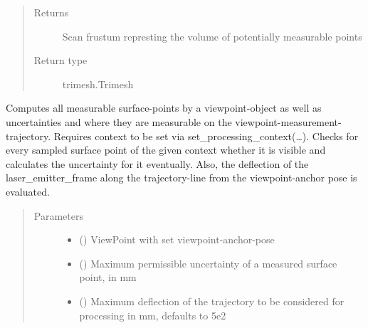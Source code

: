 \documentclass[letterpaper,10pt,english]{sphinxmanual}
\begin{document}
\begin{fulllineitems}
\begin{fulllineitems}
\begin{quote}
\begin{description}
\item[{Returns}] \leavevmode
Scan frustum represting the volume of potentially measurable points

\item[{Return type}] \leavevmode
trimesh.Trimesh

\end{description}\end{quote}

\end{fulllineitems}


\begin{fulllineitems}
\label{\detokenize{module_sensor_model:agiprobot_measurement.sensor_model.SensorModel.process_viewpoint_metrologically}}
Computes all measurable surface-points by a viewpoint-object as well as uncertainties and where they are measurable on the viewpoint-measurement-trajectory.
Requires context to be set via set\_processing\_context(…). Checks for every sampled surface point of the given context whether it is visible and calculates the
uncertainty for it eventually. Also, the deflection of the laser\_emitter\_frame along the trajectory-line from the viewpoint-anchor pose is evaluated.
\begin{quote}\begin{description}
\item[{Parameters}] \leavevmode\begin{itemize}
\item {} 
 ({\hyperref[\detokenize{module_view:agiprobot_measurement.viewpoint.ViewPoint}]{}}) \textendash{} ViewPoint with set viewpoint-anchor-pose

\item {} 
 () \textendash{} Maximum permissible uncertainty of a measured surface point, in mm

\item {} 
 (\sphinxstyleliteralemphasis{, }) \textendash{} Maximum deflection of the trajectory to be considered for processing in mm, defaults to 5e2


\end{itemize}
\end{description}
\end{quote}
\end{fulllineitems}
\end{fulllineitems}
\end{document}
